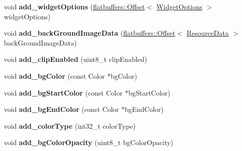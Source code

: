 \begin{DoxyCompactItemize}
\item 
\mbox{\label{structflatbuffers_1_1PanelOptionsBuilder_a34ab9eebebf4fcf3b43a7da96d6a9277}} 
void {\bfseries add\+\_\+widget\+Options} (\hyperlink{structflatbuffers_1_1Offset}{flatbuffers\+::\+Offset}$<$ \hyperlink{structflatbuffers_1_1WidgetOptions}{Widget\+Options} $>$ widget\+Options)
\item 
\mbox{\label{structflatbuffers_1_1PanelOptionsBuilder_ae426360ef716f3aa7805d5210feee9c7}} 
void {\bfseries add\+\_\+back\+Ground\+Image\+Data} (\hyperlink{structflatbuffers_1_1Offset}{flatbuffers\+::\+Offset}$<$ \hyperlink{structflatbuffers_1_1ResourceData}{Resource\+Data} $>$ back\+Ground\+Image\+Data)
\item 
\mbox{\label{structflatbuffers_1_1PanelOptionsBuilder_a012af8b0ffdee0f3458da043c2b7dfd7}} 
void {\bfseries add\+\_\+clip\+Enabled} (uint8\+\_\+t clip\+Enabled)
\item 
\mbox{\label{structflatbuffers_1_1PanelOptionsBuilder_a8b8d26d4c2d3d78775f03c1e43543046}} 
void {\bfseries add\+\_\+bg\+Color} (const Color $\ast$bg\+Color)
\item 
\mbox{\label{structflatbuffers_1_1PanelOptionsBuilder_a05a70e749923af4e52ab85820eb24c67}} 
void {\bfseries add\+\_\+bg\+Start\+Color} (const Color $\ast$bg\+Start\+Color)
\item 
\mbox{\label{structflatbuffers_1_1PanelOptionsBuilder_a34570eecb31d5f091313fb6432c80b42}} 
void {\bfseries add\+\_\+bg\+End\+Color} (const Color $\ast$bg\+End\+Color)
\item 
\mbox{\label{structflatbuffers_1_1PanelOptionsBuilder_a1a90a9f870b7d1d25c2d98db84b4e728}} 
void {\bfseries add\+\_\+color\+Type} (int32\+\_\+t color\+Type)
\item 
\mbox{\label{structflatbuffers_1_1PanelOptionsBuilder_a03536ec08a293928ae43a0170f7412c7}} 
void {\bfseries add\+\_\+bg\+Color\+Opacity} (uint8\+\_\+t bg\+Color\+Opacity)

\end{DoxyCompactItemize}
